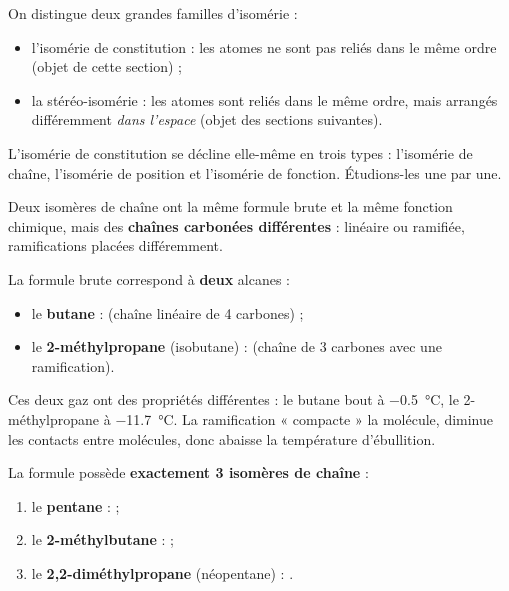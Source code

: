 \documentclass[11pt]{article}
\newcommand{\cle}[1]{{\popxbold\color{popdark}#1}}
\newcounter{popsec}
\newcounter{popsub}
\newcommand{\courssub}[1]{%
  \stepcounter{popsub}%
  \par\vspace{9pt}\noindent{\popxbold\fontsize{11.5}{13}\selectfont\color{popink}{\color{poporange}\thepopsec.\thepopsub}\hspace{6pt}#1}\par\nopagebreak\vspace{4pt}
}
\begin{document}
On distingue deux grandes familles d'isomérie :
\begin{itemize}
\item l'\cle{isomérie de constitution} : les atomes ne sont pas reliés dans le même ordre (objet de cette section) ;
\item la \cle{stéréo-isomérie} : les atomes sont reliés dans le même ordre, mais arrangés différemment \emph{dans l'espace} (objet des sections suivantes).
\end{itemize}

L'isomérie de constitution se décline elle-même en trois types : l'\cle{isomérie de chaîne}, l'\cle{isomérie de position} et l'\cle{isomérie de fonction}. Étudions-les une par une.

\courssub{Isomérie de chaîne}

\begin{definition}
Deux isomères de \cle{chaîne} ont la même formule brute et la même fonction chimique, mais des \textbf{chaînes carbonées différentes} : linéaire ou ramifiée, ramifications placées différemment.
\end{definition}

\begin{exemplebox}[Le cas de \ce{C4H10}]
La formule brute  correspond à \textbf{deux} alcanes :
\begin{itemize}
\item le \textbf{butane} :  (chaîne linéaire de 4 carbones) ;
\item le \textbf{2-méthylpropane} (isobutane) :  (chaîne de 3 carbones avec une ramification).
\end{itemize}
Ces deux gaz ont des propriétés différentes : le butane bout à \SI{-0,5}{\celsius}, le 2-méthylpropane à \SI{-11,7}{\celsius}. La ramification « compacte » la molécule, diminue les contacts entre molécules, donc abaisse la température d'ébullition.
\end{exemplebox}

\begin{exemplebox}
La formule  possède \textbf{exactement 3 isomères de chaîne} :
\begin{enumerate}
\item le \textbf{pentane} :  ;
\item le \textbf{2-méthylbutane} :  ;
\item le \textbf{2,2-diméthylpropane} (néopentane) : .
\end{enumerate}
\end{exemplebox}
\end{document}
